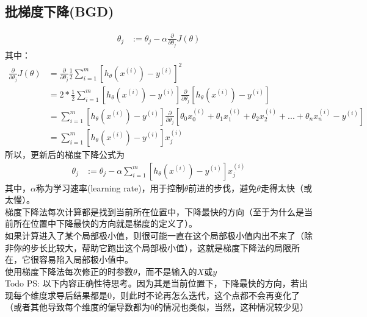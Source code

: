 \subsection{批梯度下降(BGD)}
\begin{equation}\begin{aligned}
      \theta_j &:= \theta_j - \alpha \frac{\partial} {\partial \theta_j} J(\theta)
\end{aligned}\end{equation}
其中：
\begin{equation}\begin{aligned}
      \frac{\partial} {\partial \theta_j} J(\theta) &= \frac{\partial}{\partial \theta_j} \frac{1}{2} \sum_{i=1}^m\left[ h_\theta(x^{(i)}) - y^{(i)} \right]^2 \\
      &= 2 * \frac{1}{2} \sum_{i=1}^m\left[ h_\theta(x^{(i)}) - y^{(i)} \right] \frac{\partial}{\partial\theta_j}\left[ h_\theta(x^{(i)}) - y^{(i)} \right] \\
      &= \sum_{i=1}^m\left[ h_\theta(x^{(i)}) - y^{(i)} \right]\frac{\partial}{\partial\theta_j}\left[ \theta_0x_0^{(i)} +  \theta_1x_1^{(i)} + \theta_2x_2^{(i)} + ... + \theta_nx_n^{(i)} - y^{(i)} \right] \\
      &= \sum_{i=1}^m\left[ h_\theta(x^{(i)}) - y^{(i)} \right]x_j^{(i)}
\end{aligned}\end{equation}
所以，更新后的梯度下降公式为
\begin{equation}\begin{aligned}
	\theta_j &:= \theta_j - \alpha \sum_{i=1}^m \left[ h_\theta(x^{(i)}) - y^{(i)} \right]x_j^{(i)}
\end{aligned}\end{equation}
其中，$\alpha$称为学习速率(learning rate)，用于控制$\theta$前进的步伐，避免$\theta$走得太快（或太慢）。\\

梯度下降法每次计算都是找到当前所在位置中，下降最快的方向（至于为什么是当前所在位置中下降最快的方向就是梯度的定义了）。 \\
如果计算进入了某个局部极小值，则很可能一直在这个局部极小值内出不来了（除非你的步长比较大，帮助它跑出这个局部极小值），这就是梯度下降法的局限所在，它很容易陷入局部极小值中。 \\
使用梯度下降法每次修正的时参数$\theta$，而不是输入的$X$或$y$ \\

Todo PS: 以下内容正确性待思考。因为其是当前位置下，下降最快的方向，若出现每个维度求导后结果都是0，则此时不论再怎么迭代，这个点都不会再变化了（或者其他导致每个维度的偏导数都为0的情况也类似，当然，这种情况较少见）

